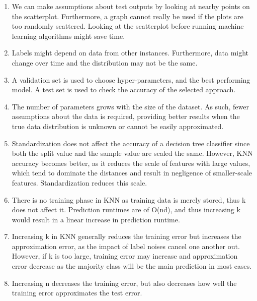 \documentclass{article}
\def\enum#1{\begin{enumerate}#1\end{enumerate}}
\begin{document}
\enum{
\item We can make assumptions about test outputs by looking at nearby points on the scatterplot. Furthermore, a graph cannot really be used if the plots are too randomly scattered. Looking at the scatterplot before running machine learning algorithms might save time.
\item Labels might depend on data from other instances. Furthermore, data might change over time and the distribution may not be the same.
\item A validation set is used to choose hyper-parameters, and the best performing model. A test set is used to check the accuracy of the selected approach.
\item The number of parameters grows with the size of the dataset. As such, fewer assumptions about the data is required, providing better results when the true data distribution is unknown or cannot be easily approximated.
\item Standardization does not affect the accuracy of a decision tree classifier since both the split value and the sample value are scaled the same. However, KNN accuracy becomes better, as it reduces the scale of features with large values, which tend to dominate the distances and result in negligence of smaller-scale features. Standardization reduces this scale.
\item There is no training phase in KNN as training data is merely stored, thus k does not affect it. Prediction runtimes are of O(nd), and thus increasing k would result in a linear increase in prediction runtime.
\item Increasing k in KNN generally reduces the training error but increases the approximation error, as the impact of label noises cancel one another out. However, if k is too large, training error may increase and approximation error decrease as the majority class will be the main prediction in most cases.
\item Increasing n decreases the training error, but also decreases how well the training error approximates the test error.
}
\end{document}
